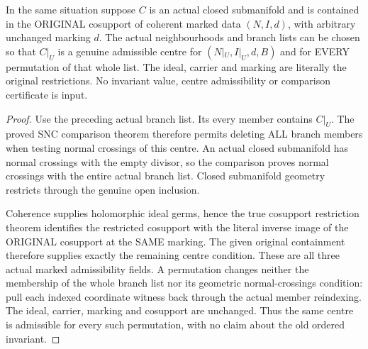 \begin{theorem}
\label{hir:nc-highest-subcentre-marked-admissibility}
In the same situation suppose $C$ is an actual closed submanifold and is
contained in the ORIGINAL cosupport of coherent marked data $(N,I,d)$, with
arbitrary unchanged marking $d$. The actual neighbourhoods and branch lists
can be chosen so that $C|_U$ is a genuine admissible centre for
$(N|_U,I|_U,d,B)$ and for EVERY permutation of that whole list. The ideal,
carrier and marking are literally the original restrictions. No invariant
value, centre admissibility or comparison certificate is input.
\leanok
\end{theorem}
\begin{proof}
Use the preceding actual branch list. Its every member contains $C|_U$.
The proved SNC comparison theorem therefore permits deleting ALL branch
members when testing normal crossings of this centre. An actual closed
submanifold has normal crossings with the empty divisor, so the comparison
proves normal crossings with the entire actual branch list. Closed
submanifold geometry restricts through the genuine open inclusion.

Coherence supplies holomorphic ideal germs, hence the true cosupport
restriction theorem identifies the restricted cosupport with the literal
inverse image of the ORIGINAL cosupport at the SAME marking. The given
original containment therefore supplies exactly the remaining centre
condition. These are all three actual marked admissibility fields.
A permutation changes neither the membership of the whole branch list nor
its geometric normal-crossings condition: pull each indexed coordinate
witness back through the actual member reindexing. The ideal, carrier,
marking and cosupport are unchanged. Thus the same centre is admissible
for every such permutation, with no claim about the old ordered invariant.
\end{proof}

